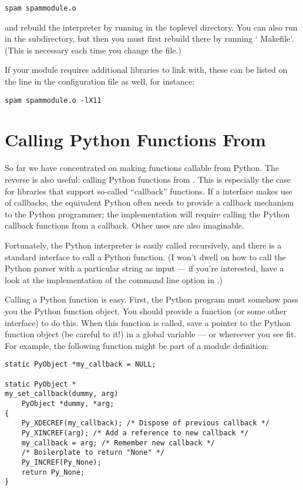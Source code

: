 \documentclass{manual}
\begin{document}
\begin{verbatim}
spam spammodule.o
\end{verbatim}

and rebuild the interpreter by running  in the toplevel
directory.  You can also run  in the 
subdirectory, but then you must first rebuild 
there by running ` Makefile'.  (This is necessary each
time you change the  file.)

If your module requires additional libraries to link with, these can
be listed on the line in the configuration file as well, for instance:

\begin{verbatim}
spam spammodule.o -lX11
\end{verbatim}

\section{Calling Python Functions From \C{}}
\label{callingPython}

So far we have concentrated on making \C{} functions callable from
Python.  The reverse is also useful: calling Python functions from \C{}.
This is especially the case for libraries that support so-called
``callback'' functions.  If a \C{} interface makes use of callbacks, the
equivalent Python often needs to provide a callback mechanism to the
Python programmer; the implementation will require calling the Python
callback functions from a \C{} callback.  Other uses are also imaginable.

Fortunately, the Python interpreter is easily called recursively, and
there is a standard interface to call a Python function.  (I won't
dwell on how to call the Python parser with a particular string as
input --- if you're interested, have a look at the implementation of
the  command line option in .)

Calling a Python function is easy.  First, the Python program must
somehow pass you the Python function object.  You should provide a
function (or some other interface) to do this.  When this function is
called, save a pointer to the Python function object (be careful to
 it!) in a global variable --- or whereever you
see fit. For example, the following function might be part of a module
definition:

\begin{verbatim}
static PyObject *my_callback = NULL;

static PyObject *
my_set_callback(dummy, arg)
    PyObject *dummy, *arg;
{
    Py_XDECREF(my_callback); /* Dispose of previous callback */
    Py_XINCREF(arg); /* Add a reference to new callback */
    my_callback = arg; /* Remember new callback */
    /* Boilerplate to return "None" */
    Py_INCREF(Py_None);
    return Py_None;
}
\end{verbatim}
\end{document}
